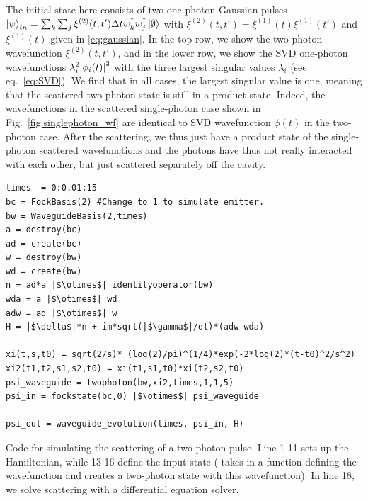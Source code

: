  The initial state here consists of two one-photon Gaussian pulses $\ket{\psi}_{in} = \sum_k \sum_j \xi^{(2)}(t,t') \Delta t w_k^\dagger w_j^\dagger \ket{\emptyset}$ with $\xi^{(2)}(t,t') = \xi^{(1)}(t) \xi^{(1)}(t')$ and $\xi^{(1)}(t)$ given in \ref{eq:gaussian}. In the top row, we show the two-photon wavefunction $\xi^{(2)}(t,t')$, and in the lower row, we show the SVD one-photon wavefunctions $\lambda_i^2 \abs{\phi_i(t)}^2$ with the three largest singular values $\lambda_i$ (see eq.~\eqref{eq:SVD}). We find that in all cases, the largest singular value is one, meaning that the scattered two-photon state is still in a product state. Indeed, the wavefunctions in the scattered single-photon case shown in Fig.~\ref{fig:singlephoton_wf} are identical to SVD wavefunction $\phi(t)$ in the two-photon case. After the scattering, we thus just have a product state of the single-photon scattered wavefunctions and the photons have thus not really interacted with each other, but just scattered separately off the cavity. 


\begin{listing}[H]
\begin{verbatim}
times  = 0:0.01:15
bc = FockBasis(2) #Change to 1 to simulate emitter.
bw = WaveguideBasis(2,times)
a = destroy(bc)
ad = create(bc)
w = destroy(bw)
wd = create(bw)
n = ad*a |$\otimes$| identityoperator(bw)
wda = a |$\otimes$| wd
adw = ad |$\otimes$| w
H = |$\delta$|*n + im*sqrt(|$\gamma$|/dt)*(adw-wda)

xi(t,s,t0) = sqrt(2/s)* (log(2)/pi)^(1/4)*exp(-2*log(2)*(t-t0)^2/s^2)
xi2(t1,t2,s1,s2,t0) = xi(t1,s1,t0)*xi(t2,s2,t0)
psi_waveguide = twophoton(bw,xi2,times,1,1,5)
psi_in = fockstate(bc,0) |$\otimes$| psi_waveguide

psi_out = waveguide_evolution(times, psi_in, H)
\end{verbatim}
\caption{Code for simulating the scattering of a two-photon pulse. Line 1-11 sets up the Hamiltonian, while 13-16 define the input state ( takes in a function  defining the wavefunction and creates a two-photon state with this wavefunction). In line 18, we solve scattering with a differential equation solver.}
\label{ls:twophoton_scattering}
\end{listing}


